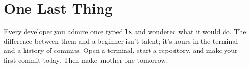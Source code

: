 \section{One Last Thing}\label{13-where-to-go-from-here:one-last-thing}

Every developer you admire once typed \texttt{ls} and wondered what it would do. The difference between them and a beginner isn't talent; it's hours in the terminal and a history of commits. Open a terminal, start a repository, and make your first commit today. Then make another one tomorrow.
